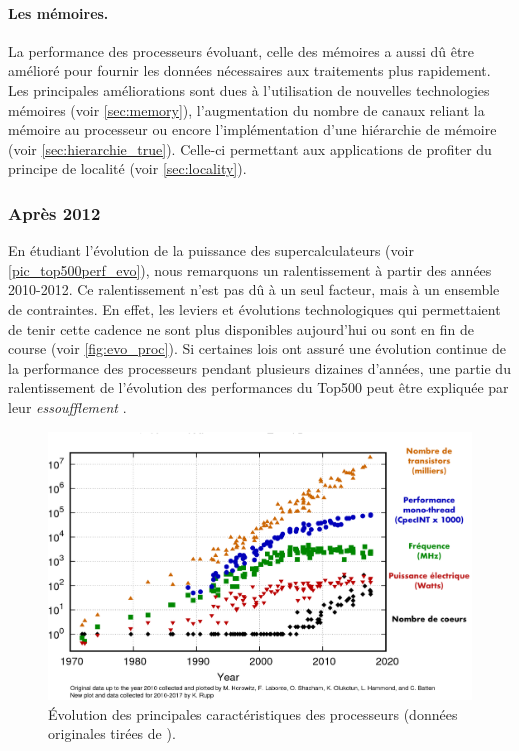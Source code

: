             \paragraph{Les mémoires.} La performance des processeurs évoluant, celle des mémoires a aussi dû être amélioré pour fournir les données nécessaires aux traitements plus rapidement. Les principales améliorations sont dues à l'utilisation de nouvelles technologies mémoires (voir \autoref{sec:memory}), l'augmentation du nombre de canaux reliant la mémoire au processeur ou encore l'implémentation d'une hiérarchie de mémoire (voir \autoref{sec:hierarchie_true}). Celle-ci permettant aux applications de profiter du principe de localité (voir \autoref{sec:locality}).
            
        
    \subsubsection{Après 2012}
    
        En étudiant l'évolution de la puissance des supercalculateurs (voir \autoref{pic_top500perf_evo}), nous remarquons un ralentissement à partir des années 2010-2012. Ce ralentissement n'est pas dû à un seul facteur, mais à un ensemble de contraintes. En effet, les leviers et évolutions technologiques qui permettaient de tenir cette cadence ne sont plus disponibles aujourd'hui ou sont en fin de course (voir \autoref{fig:evo_proc}). Si certaines lois ont assuré une évolution continue de la performance des processeurs pendant plusieurs dizaines d'années, une partie du ralentissement de l'évolution des performances du Top500 peut être expliquée par leur \textit{essoufflement} \cite{FrancoisBodin2015}.

       
        \begin{figure}
            \center
            \includegraphics[width=12cm]{images/evo_proc.png}
            \caption{\label{fig:evo_proc} Évolution des principales caractéristiques des processeurs (données originales tirées de \cite{rupp40years}\protect\footnotemark).}
        \end{figure}
        
